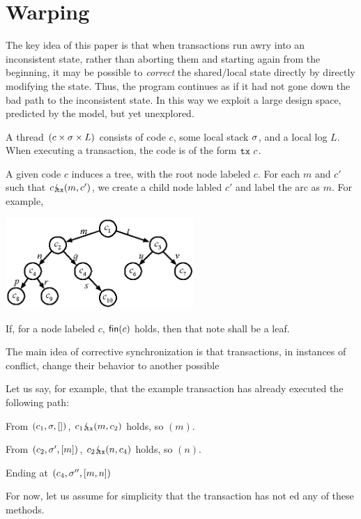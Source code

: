 

\section{Warping}
\label{sect:warping}

The key idea of this paper is that when transactions run
awry into an inconsistent state, rather than aborting them and
starting again from the beginning, it may be possible to
\emph{correct} the shared/local state directly by directly
modifying the state. Thus, the program continues as if it had not
gone down the bad path to the inconsistent state.
In this way we exploit a large design space, predicted by the \PMPY{}
model, but yet unexplored.





A thread
$(c\times \sigma \times L)$ consists of code $c$, some local stack
$\sigma$, and a local log $L$. When executing a transaction, the
code is of the form $\texttt{tx}\ c$.

A given code $c$ induces a tree, with the root node labeled $c$. For
each $m$ and $c'$ such that $c \lightning_{\mkern-7mu \texttt{tx}} (m,c')$, we create a child node
labled $c'$ and label the arc as $m$. For example,
\begin{center}
\includegraphics[width=2.8in]{stages0.eps}
\end{center}
If, for a node labeled $c$, $\textsf{fin}(c)$ holds, then that note shall
be a leaf.

The main idea of corrective synchronization is that transactions, in
instances of conflict, change their behavior to another possible

Let us say, for example, that the example transaction has already
executed the following path:
\begin{itemize*}
\item From $(c_1,\sigma,[])$, $c_1 \lightning_{\mkern-7mu \texttt{tx}} (m,c_2)$ holds, so \APPLY{}$(m)$.
\item From $(c_2,\sigma',[m])$, $c_2 \lightning_{\mkern-7mu \texttt{tx}} (n,c_4)$ holds, so \APPLY{}$(n)$.
\item Ending at $(c_4,\sigma'',[m,n])$
\end{itemize*}
For now, let us assume for simplicity that the transaction has not
\PUSH{}ed any of these methods.

